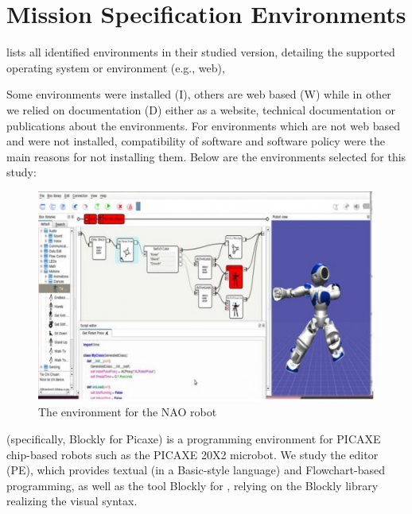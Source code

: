 \section{Mission Specification Environments}\label{sec:environments}

 lists all identified environments in their studied version, detailing the supported operating system or environment (e.g., web), 

Some environments were installed (I), others are web based (W) while in other we relied on documentation (D) either as a website, technical documentation or publications about the environments. For environments which are not web based and were not installed, compatibility of software and software policy were  the main reasons for not installing them. Below are the environments selected for this study:



\begin{figure}[t]
     \centering
    \includegraphics[width=\columnwidth]{choregraphe.png}
      \caption{The environment \choregraphe for the NAO robot}
      \label{fig:choregraphe}
   \end{figure}


\parhead{\picaxe} (specifically, Blockly for Picaxe) is a programming environment for PICAXE chip-based robots such as the PICAXE 20X2 microbot. We study the \picaxe editor (PE), which provides textual (in a Basic-style language) and Flowchart-based programming, as well as the tool Blockly for \picaxe, relying on the Blockly library realizing the visual syntax.

